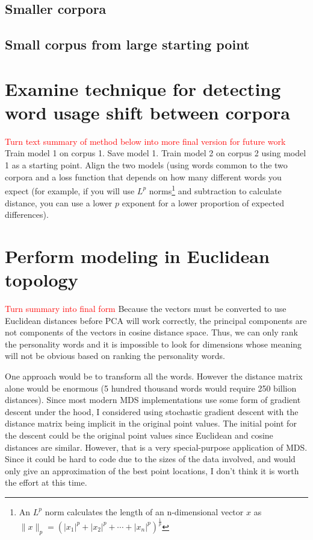 \documentclass[10pt,letterpaper]{book}
\newcommand{\todo}[1]{\textcolor{red}{#1}}
\begin{document}
\subsection{Smaller corpora}
\subsection{Small corpus from large starting point}

\section{Examine technique for detecting word usage shift between corpora}

\todo{Turn text summary of method below into more final version for future work}
Train model 1 on corpus 1. Save model 1. Train model 2 on corpus 2 using model 1 as a starting point. Align the two models (using words common to the two corpora and a loss function that depends on how many different words you expect (for example, if you will use $L^p$ norms\footnote{An $L^p$ norm calculates the length of an n-dimensional vector $x$ as $\|x\|_p=\left(|x_1|^p+|x_2|^p+\dotsb+|x_n|^p\right)^{\frac{1}{p}}$} and subtraction to calculate distance, you can use a lower $p$ exponent for a lower proportion of expected differences).

\section{Perform modeling in Euclidean topology}

\todo{Turn summary into final form}
Because the vectors must be converted to use Euclidean distances before PCA will work correctly, the principal components are not components of the vectors in cosine distance space. Thus, we can only rank the personality words and it is impossible to look for dimensions whose meaning will not be obvious based on ranking the personality words.

One approach would be to transform all the words. However the distance matrix alone would be enormous (5 hundred thousand words would require 250 billion distances). Since most modern MDS implementations use some form of gradient descent under the hood, I considered using stochastic gradient descent with the distance matrix being implicit in the original point values. The initial point for the descent could be the original point values since Euclidean and cosine distances are similar. However, that is a very special-purpose application of MDS. Since it could be hard to code due to the sizes of the data involved, and would only give an approximation of the best point locations, I don't think it is worth the effort at this time.
\end{document}
